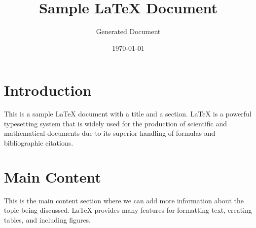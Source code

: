\documentclass{article}
\title{Sample LaTeX Document}
\author{Generated Document}
\date{\today}
\begin{document}
\maketitle

\section{Introduction}
This is a sample LaTeX document with a title and a section. LaTeX is a powerful typesetting system that is widely used for the production of scientific and mathematical documents due to its superior handling of formulas and bibliographic citations.

\section{Main Content}
This is the main content section where we can add more information about the topic being discussed. LaTeX provides many features for formatting text, creating tables, and including figures.
\end{document}
